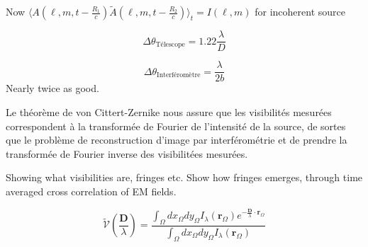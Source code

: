 Now $\langle A(\ell,m,t - \frac{R_1}{c}) \tilde{A}(\ell,m,t - \frac{R_2}{c}) \rangle_t = I(\ell, m)$ for incoherent source


\begin{equation}\label{eq:Rayleigh}
       \Delta \theta_{\text{Télescope}} = 1.22 \frac{\lambda}{D}
\end{equation} 

\begin{equation}\label{eq:Michelson}
        \Delta \theta_{\text{Interféromètre}} = \frac{\lambda}{2b} 
\end{equation} 
Nearly twice as good.







Le théorème de von Cittert-Zernike nous assure que les visibilités mesurées correspondent à la transformée 
de Fourier de l'intensité de la source, de sortes que le problème de reconstruction d'image par interférométrie et 
de prendre la transformée de Fourier inverse des visibilitées mesurées.

Showing what visibilities are, fringes etc.
Show how fringes emerges, through time averaged cross correlation of EM fields.

\begin{equation}
        \tilde{\mathcal{V}}\left( \frac{\mathbf{D}}{\lambda} \right) = \frac{\displaystyle \int_{\Omega}dx_\Omega dy_\Omega I_\lambda (\mathbf{r}_\Omega) e^{-\frac{\mathbf{D}}{\lambda} \cdot \mathbf{r}_\Omega}}{\displaystyle \int_{\Omega} dx_\Omega dy_\Omega I_\lambda (\mathbf{r}_{\Omega})}
\end{equation}

